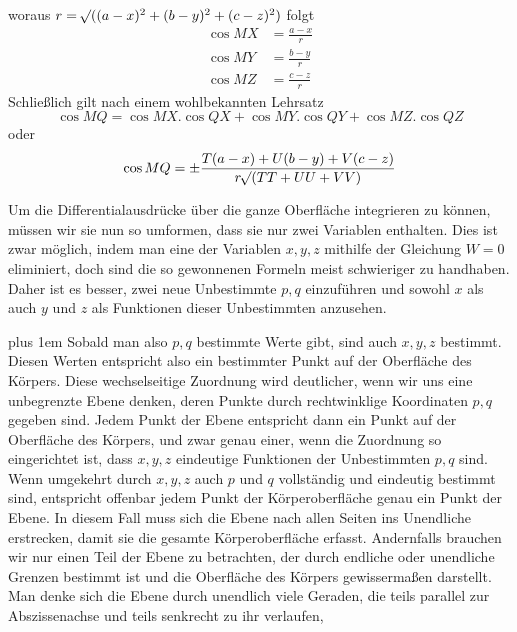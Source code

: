 woraus $r=\mathord{{}^{}\!\surd}((a-x)^2+(b-y)^2+(c-z)^2)$ folgt
\[
\begin{aligned}
\cos MX&=\frac{a-x}{r}\\
\cos MY&=\frac{b-y}{r}\\
\cos MZ&=\frac{c-z}{r}
\end{aligned}
\]
Schließlich gilt nach einem wohlbekannten Lehrsatz
\[
\cos MQ=\cos MX.\cos QX+\cos MY.\cos QY+\cos MZ.\cos QZ
\]
oder
\[
\cos MQ=\pm\frac{T(a-x)+U(b-y)+V(c-z)}{r\mathord{{}^{}\!\surd}(TT+UU+VV)}
\]

\par
Um die Differentialausdrücke über die ganze Oberfläche integrieren zu können, müssen wir sie nun so umformen, dass sie nur zwei Variablen enthalten. Dies ist zwar möglich, indem man eine der Variablen $x,y,z$ mithilfe der Gleichung $W=0$ eliminiert, doch sind die so gewonnenen Formeln meist schwieriger zu handhaben. Daher ist es besser, zwei neue Unbestimmte $p,q$ einzuführen und sowohl $x$ als auch $y$ und $z$ als Funktionen dieser Unbestimmten anzusehen.

\begingroup\rightskip=0pt plus 1em
Sobald man also $p,q$ bestimmte Werte gibt, sind auch $x,y,z$ bestimmt. Diesen Werten entspricht also ein bestimmter Punkt auf der Oberfläche des Körpers. Diese wechselseitige Zuordnung wird deutlicher, wenn wir uns eine unbegrenzte Ebene denken, deren Punkte durch rechtwinklige Koordinaten $p,q$ gegeben sind. Jedem Punkt der Ebene entspricht dann ein Punkt auf der Oberfläche des Körpers, und zwar genau einer, wenn die Zuordnung so eingerichtet ist, dass $x,y,z$ eindeutige Funktionen der Unbestimmten $p,q$ sind. Wenn umgekehrt durch $x,y,z$ auch $p$ und $q$ vollständig und eindeutig bestimmt sind, entspricht offenbar jedem Punkt der Körperoberfläche genau ein Punkt der Ebene. In diesem Fall muss sich die Ebene nach allen Seiten ins Unendliche erstrecken, damit sie die gesamte Körperoberfläche erfasst. Andernfalls brauchen wir nur einen Teil der Ebene zu betrachten, der durch endliche oder unendliche Grenzen bestimmt ist und die Oberfläche des Körpers gewissermaßen darstellt. Man denke sich die Ebene durch unendlich viele Geraden, die teils parallel zur Abszissenachse und teils senkrecht zu ihr verlaufen,
